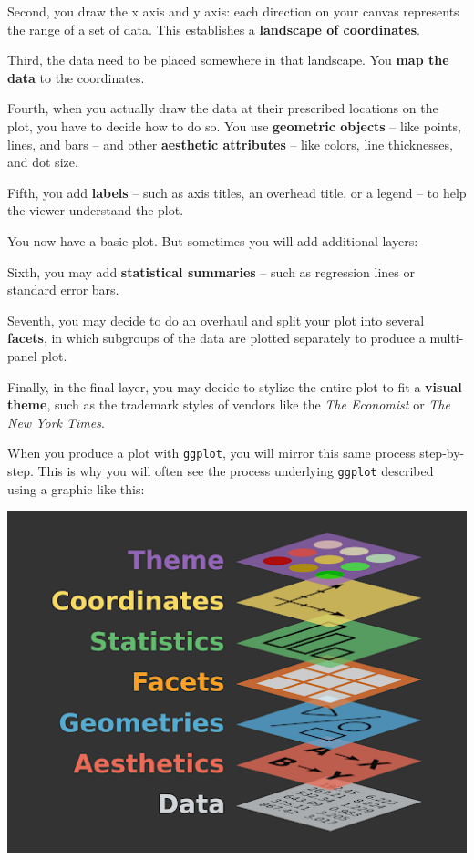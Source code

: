 \documentclass[
]{book}
\begin{document}
Second, you draw the x axis and y axis: each direction on your canvas represents the range of a set of data. This establishes a \textbf{landscape of coordinates}.

Third, the data need to be placed somewhere in that landscape. You \textbf{map the data} to the coordinates.

Fourth, when you actually draw the data at their prescribed locations on the plot, you have to decide how to do so. You use \textbf{geometric objects} -- like points, lines, and bars -- and other \textbf{aesthetic attributes} -- like colors, line thicknesses, and dot size.

Fifth, you add \textbf{labels} -- such as axis titles, an overhead title, or a legend -- to help the viewer understand the plot.

You now have a basic plot. But sometimes you will add additional layers:

Sixth, you may add \textbf{statistical summaries} -- such as regression lines or standard error bars.

Seventh, you may decide to do an overhaul and split your plot into several \textbf{facets}, in which subgroups of the data are plotted separately to produce a multi-panel plot.

Finally, in the final layer, you may decide to stylize the entire plot to fit a \textbf{visual theme}, such as the trademark styles of vendors like the \emph{The Economist} or \emph{The New York Times}.

When you produce a plot with \texttt{ggplot}, you will mirror this same process step-by-step. This is why you will often see the process underlying \texttt{ggplot} described using a graphic like this:

\includegraphics{img/ggplot.png}
\end{document}

